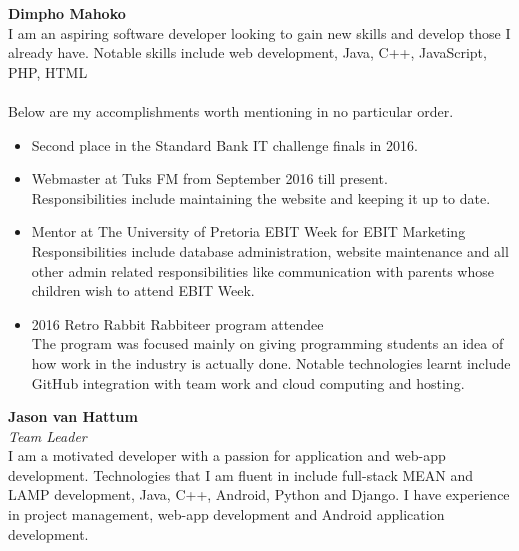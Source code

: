 \textbf{Dimpho Mahoko} \\
	I am an aspiring software developer looking to gain new skills and develop those I already have. Notable skills include web development, Java, C++, JavaScript, PHP, HTML  \\ \\ %
	 Below are my accomplishments worth mentioning in no particular order.
	\begin{itemize}
		\item Second place in the Standard Bank IT challenge finals in 2016.\\
	
		\item Webmaster at Tuks FM from September 2016 till present. \\ 
			Responsibilities include maintaining the website and keeping it up to date. \\
			
		\item Mentor at The University of Pretoria EBIT Week for EBIT Marketing \\
			Responsibilities include database administration, website maintenance and all other admin related responsibilities like communication with parents whose children wish to attend EBIT Week. \\
			
		\item 2016 Retro Rabbit Rabbiteer program attendee \\
			The program was focused mainly on giving programming students an idea of how work in the industry is actually done. Notable technologies learnt include GitHub integration with team work and cloud computing and hosting. \\%
	\end{itemize}
	

\textbf{Jason van Hattum}\\
\textit{Team Leader}\\
    I am a motivated developer with a passion for application and web-app development. Technologies that I am fluent in include full-stack MEAN and LAMP development, Java, C++, Android, Python and Django. I have experience in project management, web-app development and Android application development. \\
    
